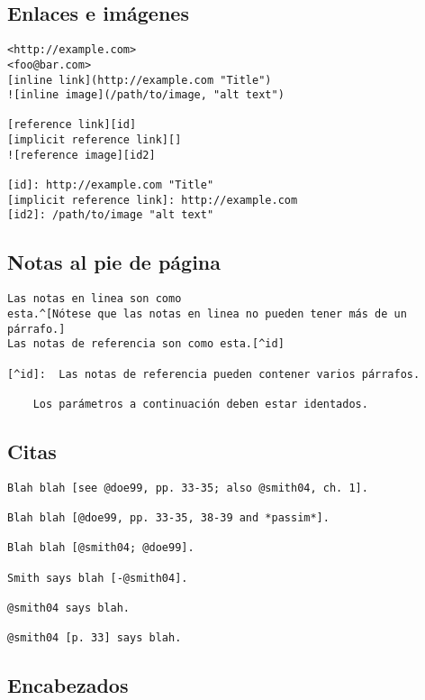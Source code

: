 \documentclass[12pt,spanish,]{article}
\begin{document}
\subsection{Enlaces e imágenes}\label{enlaces-e-imuxe1genes}

\begin{verbatim}
<http://example.com>
<foo@bar.com>
[inline link](http://example.com "Title")
![inline image](/path/to/image, "alt text")

[reference link][id]
[implicit reference link][]
![reference image][id2]

[id]: http://example.com "Title"
[implicit reference link]: http://example.com
[id2]: /path/to/image "alt text"
\end{verbatim}

\subsection{Notas al pie de página}\label{notas-al-pie-de-puxe1gina}

\begin{verbatim}
Las notas en linea son como
esta.^[Nótese que las notas en linea no pueden tener más de un párrafo.]
Las notas de referencia son como esta.[^id]

[^id]:  Las notas de referencia pueden contener varios párrafos.

    Los parámetros a continuación deben estar identados.
\end{verbatim}

\subsection{Citas}\label{citas}

\begin{verbatim}
Blah blah [see @doe99, pp. 33-35; also @smith04, ch. 1].

Blah blah [@doe99, pp. 33-35, 38-39 and *passim*].

Blah blah [@smith04; @doe99].

Smith says blah [-@smith04].

@smith04 says blah.

@smith04 [p. 33] says blah.
\end{verbatim}

\subsection{Encabezados}\label{encabezados}
\end{document}
